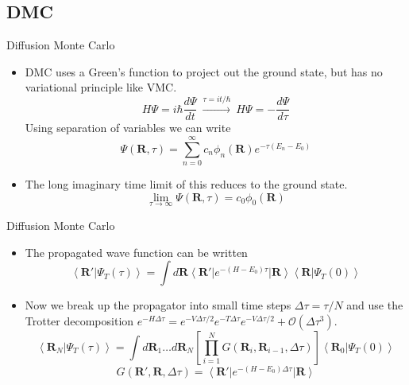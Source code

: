 \documentclass{beamer}
\newcommand{\ket}[1]{\left| #1 \right>}
\newcommand{\bra}[1]{\left< #1 \right|}
\newcommand{\braket}[2]{\left< #1 | #2 \right>}
\newcommand{\R}{\mathbf{R}}
\newcommand{\dt}{\Delta\tau}
\begin{document}
\iffalse
\subsection{DMC}
\begin{frame}{Diffusion Monte Carlo}
\begin{itemize}
   \item DMC uses a Green's function to project out the ground state, but has no variational principle like VMC.
   \begin{equation*}
      H\Psi = i\hbar\frac{d\Psi}{dt} ~ \xrightarrow{\tau=it/\hbar} ~ H\Psi = -\frac{d\Psi}{d\tau}
   \end{equation*}
   Using separation of variables we can write
   \begin{equation*}
      \Psi(\R,\tau) = \sum\limits_{n=0}^{\infty} c_n\phi_n(\R) e^{-\tau(E_n-E_0)}
   \end{equation*}
   \item The long imaginary time limit of this reduces to the ground state.
   \begin{equation*}
      \lim\limits_{\tau\rightarrow\infty} \Psi(\R,\tau) = c_0\phi_0(\R)
   \end{equation*}
\end{itemize}
\end{frame}

\begin{frame}{Diffusion Monte Carlo}
\begin{itemize}
   \item The propagated wave function can be written
   \begin{equation*}
      \braket{\R'}{\Psi_T(\tau)} = \int d\R \bra{\R'}e^{-(H-E_0)\tau}\ket{\R}\braket{\R}{\Psi_T(0)}
   \end{equation*}
   \item Now we break up the propagator into small time steps $\dt = \tau/N$ and use the Trotter decomposition $e^{-H\Delta\tau}=e^{-V\Delta\tau/2}e^{-T\Delta\tau}e^{-V\Delta\tau/2}+\mathcal{O}(\Delta\tau^3)$.
   \begin{equation*}
      \braket{\R_N}{\Psi_T(\tau)} = \int d\R_1 \ldots d\R_N \left[\prod\limits_{i=1}^N G(\R_i,\R_{i-1},\Delta\tau)\right] \braket{\R_0}{\Psi_T(0)}
   \end{equation*}
   \begin{equation*}
      G(\R',\R,\Delta\tau) = \bra{\R'}e^{-(H-E_0)\Delta\tau}\ket{\R}
   \end{equation*}
\end{itemize}
\end{frame}
\end{document}
